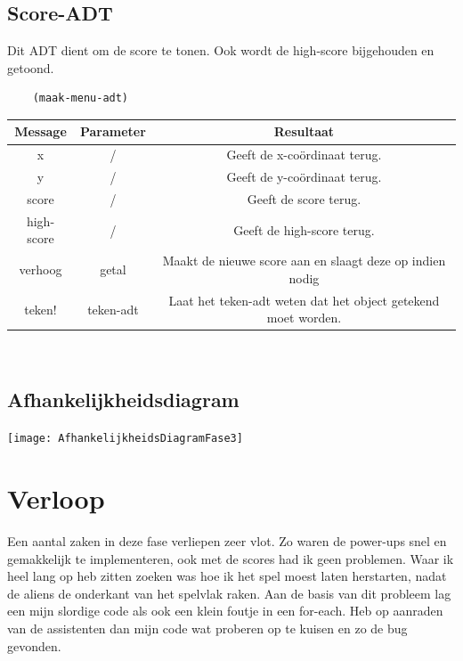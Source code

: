 \documentclass[]{article}
\begin{document}
\subsection{Score-ADT}
Dit ADT dient om de score te tonen. Ook wordt de high-score bijgehouden en getoond.

\begin{center}
	\begin{lstlisting}
	(maak-menu-adt)
	\end{lstlisting}
	\begin{tabular}{|c|c|c|}
		\hline  \textbf{Message} &\textbf{Parameter} & \textbf{Resultaat}  \\
		\hline x & /&Geeft de x-co\"{o}rdinaat terug. \\
		\hline y & /&Geeft de y-co\"{o}rdinaat terug. \\
		\hline score & /&Geeft de score terug. \\
		\hline high-score & /&Geeft de high-score terug. \\
		\hline verhoog & getal & Maakt de nieuwe score aan en slaagt deze op indien nodig \\
		\hline  teken! &teken-adt& Laat het teken-adt weten dat het object getekend moet worden. \\
		\hline 
	\end{tabular}
\end{center}\
\begin{samepage}
\section{Afhankelijkheidsdiagram}
\begin{center}
\texttt{[image: AfhankelijkheidsDiagramFase3]}
\end{center}
\end{samepage}

\section{Verloop}
Een aantal zaken in deze fase verliepen zeer vlot. Zo waren de power-ups snel en gemakkelijk te implementeren, ook met de scores had ik geen problemen. Waar ik heel lang op heb zitten zoeken was hoe ik het spel moest laten herstarten, nadat de aliens de onderkant van het spelvlak raken. Aan de basis van dit probleem lag een mijn slordige code als ook een klein foutje in een for-each. Heb op aanraden van de assistenten dan mijn code wat proberen op te kuisen en zo de bug gevonden.
\end{document}
